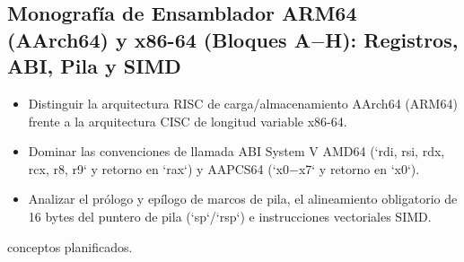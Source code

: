 \documentclass{book}
\begin{document}
\subsection*{\checkmark Monografía de Ensamblador ARM64 (AArch64) y x86-64 (Bloques A\(-\)H): Registros, ABI, Pila y SIMD}
\begin{itemize}
\item Distinguir la arquitectura RISC de carga/almacenamiento AArch64 (ARM64) frente a la arquitectura CISC de longitud variable x86-64.
\item Dominar las convenciones de llamada ABI System V AMD64 (`rdi, rsi, rdx, rcx, r8, r9` y retorno en `rax`) y AAPCS64 (`x0\(-\)x7` y retorno en `x0`).
\item Analizar el prólogo y epílogo de marcos de pila, el alineamiento obligatorio de 16 bytes del puntero de pila (`sp`/`rsp`) e instrucciones vectoriales SIMD.
\end{itemize}
 conceptos planificados.
\end{document}
